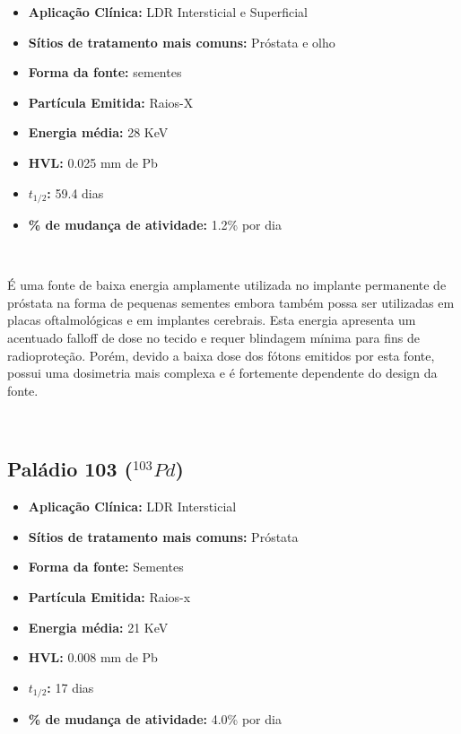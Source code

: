 \documentclass[11pt,a4paper]{article}
\begin{document}
			\begin{itemize}
				\item \textbf{Aplicação Clínica:} LDR Intersticial e Superficial
				\item \textbf{Sítios de tratamento mais comuns:} Próstata e olho
				\item \textbf{Forma da fonte:} sementes
				\item \textbf{Partícula Emitida:} Raios-X
				\item \textbf{Energia média: } 28 KeV
				\item \textbf{HVL:} 0.025 mm de Pb
				\item \textbf{$t_{1/2}$:} 59.4 dias
				\item \textbf{\% de mudança de atividade: } 1.2\% por dia
			\end{itemize}

			\

			É uma fonte de baixa energia amplamente utilizada no implante permanente de próstata na forma de pequenas sementes embora também possa ser utilizadas em placas oftalmológicas e em implantes cerebrais. Esta energia apresenta um acentuado falloff de dose no tecido e requer blindagem mínima para fins de radioproteção. Porém, devido a baixa dose dos fótons emitidos por esta fonte, possui uma dosimetria mais complexa e é fortemente dependente do design da fonte.

			\

		\subsection{Paládio 103 \textbf{\textcolor{CarnationPink}{(${}^{103}Pd$)}}}


			\begin{itemize}
				\item \textbf{Aplicação Clínica:} LDR Intersticial
				\item \textbf{Sítios de tratamento mais comuns:} Próstata
				\item \textbf{Forma da fonte:} Sementes
				\item \textbf{Partícula Emitida:} Raios-x
				\item \textbf{Energia média: } 21 KeV
				\item \textbf{HVL:} 0.008 mm de Pb
				\item \textbf{$t_{1/2}$:} 17 dias
				\item \textbf{\% de mudança de atividade: } 4.0\% por dia
			\end{itemize}
\end{document}
